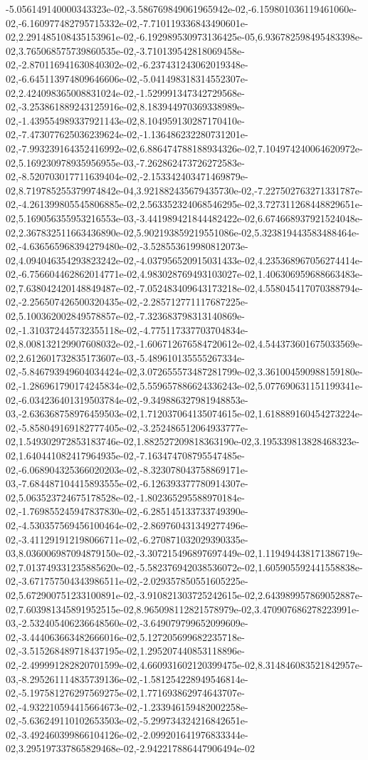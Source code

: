 -5.056149140000343323e-02,-3.586769849061965942e-02,-6.159801036119461060e-02,-6.160977482795715332e-02,-7.710119336843490601e-02,2.291485108435153961e-02,-6.192989530973136425e-05,6.936782598495483398e-02,3.765068575739860535e-02,-3.710139542818069458e-02,-2.870116941630840302e-02,-6.237431243062019348e-02,-6.645113974809646606e-02,-5.041498318314552307e-02,2.424098365008831024e-02,-1.529991347342729568e-02,-3.253861889243125916e-02,8.183944970369338989e-02,-1.439554989337921143e-02,8.104959130287170410e-02,-7.473077625036239624e-02,-1.136486232280731201e-02,-7.993239164352416992e-02,6.886474788188934326e-02,7.104974240064620972e-02,5.169230978935956955e-03,-7.262862473726272583e-02,-8.520703017711639404e-02,-2.153342403471469879e-02,8.719785255379974842e-04,3.921882435679435730e-02,-7.227502763271331787e-02,-4.261399805545806885e-02,2.563352324068546295e-02,3.727311268448829651e-02,5.169056355953216553e-03,-3.441989421844482422e-02,6.674668937921524048e-02,2.367832511663436890e-02,5.902193859219551086e-02,5.323819443583488464e-02,-4.636565968394279480e-02,-3.528553619980812073e-02,4.094046354293823242e-02,-4.037956520915031433e-02,4.235368967056274414e-02,-6.756604462862014771e-02,4.983028769493103027e-02,1.406306959688663483e-02,7.638042420148849487e-02,-7.052483409643173218e-02,4.558045417070388794e-02,-2.256507426500320435e-02,-2.285712771117687225e-02,5.100362002849578857e-02,-7.323683798313140869e-02,-1.310372445732355118e-02,-4.775117337703704834e-02,8.008132129907608032e-02,-1.606712676584720612e-02,4.544373601675033569e-02,2.612601732835173607e-03,-5.489610135555267334e-02,-5.846793949604034424e-02,3.072655573487281799e-02,3.361004590988159180e-02,-1.286961790174245834e-02,5.559657886624336243e-02,5.077690631151199341e-02,-6.034236401319503784e-02,-9.349886327981948853e-03,-2.636368758976459503e-02,1.712037064135074615e-02,1.618889160454273224e-02,-5.858049169182777405e-02,-3.252486512064933777e-02,1.549302972853183746e-02,1.882527209818363190e-02,3.195339813828468323e-02,1.640441082417964935e-02,-7.163474708795547485e-02,-6.068904325366020203e-02,-8.323078043758869171e-03,-7.684487104415893555e-02,-6.126393377780914307e-02,5.063523724675178528e-02,-1.802365295588970184e-02,-1.769855245947837830e-02,-6.285145133733749390e-02,-4.530357569456100464e-02,-2.869760431349277496e-02,-3.411291912198066711e-02,-6.270871032029390335e-03,8.036006987094879150e-02,-3.307215496897697449e-02,1.119494438171386719e-02,7.013749331235885620e-02,-5.582376942038536072e-02,1.605905592441558838e-02,-3.671757504343986511e-02,-2.029357850551605225e-02,5.672900751233100891e-02,-3.910821303725242615e-02,2.643989957869052887e-02,7.603981345891952515e-02,8.965098112821578979e-02,3.470907686278223991e-03,-2.532405406236648560e-02,-3.649079799652099609e-02,-3.444063663482666016e-02,5.127205699682235718e-02,-3.515268489718437195e-02,1.295207440853118896e-02,-2.499991282820701599e-02,4.660931602120399475e-02,8.314846083521842957e-03,-8.295261114835739136e-02,-1.581254228949546814e-02,-5.197581276297569275e-02,1.771693862974643707e-02,-4.932210594415664673e-02,-1.233946159482002258e-02,-5.636249110102653503e-02,-5.299734324216842651e-02,-3.492460399866104126e-02,-2.099201641976833344e-02,3.295197337865829468e-02,-2.942217886447906494e-02
